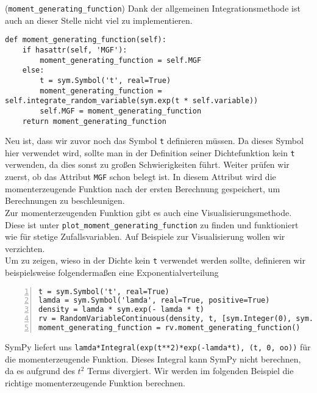 \begin{Code}{(\lstinline|moment_generating_function|)}
Dank der allgemeinen Integrationsmethode ist auch an dieser Stelle nicht viel zu implementieren.
\begin{lstlisting}
def moment_generating_function(self):
    if hasattr(self, 'MGF'):
        moment_generating_function = self.MGF
    else:
        t = sym.Symbol('t', real=True)
        moment_generating_function = self.integrate_random_variable(sym.exp(t * self.variable))
        self.MGF = moment_generating_function
    return moment_generating_function
\end{lstlisting}
Neu ist, dass wir zuvor noch das Symbol \lstinline|t| definieren müssen. Da dieses Symbol hier verwendet wird, sollte man in der Definition seiner Dichtefunktion kein \lstinline|t| verwenden, da dies sonst zu großen Schwierigkeiten führt. Weiter prüfen wir zuerst, ob das Attribut \lstinline|MGF| schon belegt ist. In diesem Attribut wird die momenterzeugende Funktion nach der ersten Berechnung gespeichert, um Berechnungen zu beschleunigen.\\

Zur momenterzeugenden Funktion gibt es auch eine Visualisierungsmethode. Diese ist unter \lstinline|plot_moment_generating_function| zu finden und funktioniert wie \hyperlink{Code:PlotDensity}{} für stetige Zufallsvariablen. Auf Beispiele zur Visualisierung wollen wir verzichten.\\

Um zu zeigen, wieso in der Dichte kein \lstinline|t| verwendet werden sollte, definieren wir beispielsweise folgendermaßen eine Exponentialverteilung
\begin{lstlisting}[numbers=left, numberstyle=\tiny\color{codegray}]
t = sym.Symbol('t', real=True)
lamda = sym.Symbol('lamda', real=True, positive=True)
density = lamda * sym.exp(- lamda * t)
rv = RandomVariableContinuous(density, t, [sym.Integer(0), sym.oo])
moment_generating_function = rv.moment_generating_function()
\end{lstlisting}
SymPy liefert uns \lstinline|lamda*Integral(exp(t**2)*exp(-lamda*t), (t, 0, oo))| für die momenterzeugende Funktion. Dieses Integral kann SymPy nicht berechnen, da es aufgrund des $t^2$ Terms divergiert. Wir werden im folgenden Beispiel die richtige momenterzeugende Funktion berechnen.
\end{Code}

\vspace*{-\medskipamount}

